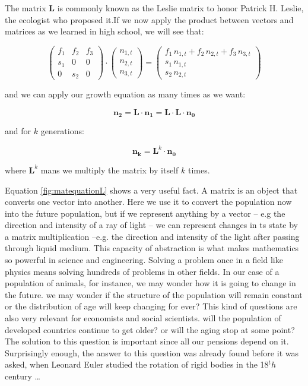 \documentclass[12pt]{article}
\begin{document}
The matrix $\mathbf{L}$ is commonly known as the Leslie matrix to honor Patrick H. Leslie, the ecologist who proposed it.If we now apply the product between vectors and matrices as we learned in high school, we will see that:

\begin{equation}
	 	\begin{pmatrix}
		f_1	&f_2	&f_3	\\
		s_1	&0	&0	\\
		0	&s_2	&0
	\end{pmatrix} \cdot \begin{pmatrix} n_{1,t}\\ n_{2,t} \\ n_{3,t}\end{pmatrix} = \begin{pmatrix} f_1 \,n_{1,t} + f_2 \,n_{2,t} + f_3 \,n_{3,t}\\ s_1 \, n_{1,t} \\ s_2 \, n_{2,t}\end{pmatrix}
\end{equation}

and we can apply our growth equation as many times as we want:

\begin{equation}
	\mathbf{n_{2}} =\mathbf{L} \cdot \mathbf{n_1} = \mathbf{L} \cdot \mathbf{L} \cdot \mathbf{n_0} 
	\label{fig:matequationL}
\end{equation}

and for $k$ generations:

\begin{equation}
	\mathbf{n_k} =\mathbf{L}^k \cdot \mathbf{n_0}
\end{equation}

where $\mathbf{L}^k$ mans we multiply the matrix by itself $k$ times.

Equation \ref{fig:matequationL} shows a very useful fact. A matrix is an object that converts one vector into another. Here we use it to convert the population now into the future population, but if we represent anything by a vector -- e.g the direction and intensity of a ray of light -- we can represent changes in ts state by a matrix multiplication --e.g. the direction and intensity of the light after passing through liquid medium. This capacity of abstraction is what makes mathematics so powerful in science and engineering. Solving a problem once in a field like physics means solving hundreds of problems in other fields. In our case of a population of animals, for instance, we may wonder how it is going to change in the future. we may wonder if the structure of the population will remain constant or the distribution of age will keep changing for ever? This kind of questions are also very relevant for economists and social scientists. will the population of developed countries continue to get older? or will the aging stop at some point? The solution to this question is important since all our pensions depend on it. Surprisingly enough, the answer to this question was already found before it was asked, when Leonard Euler studied the rotation of rigid bodies in the 18$^th$ century \dots 
\end{document}
